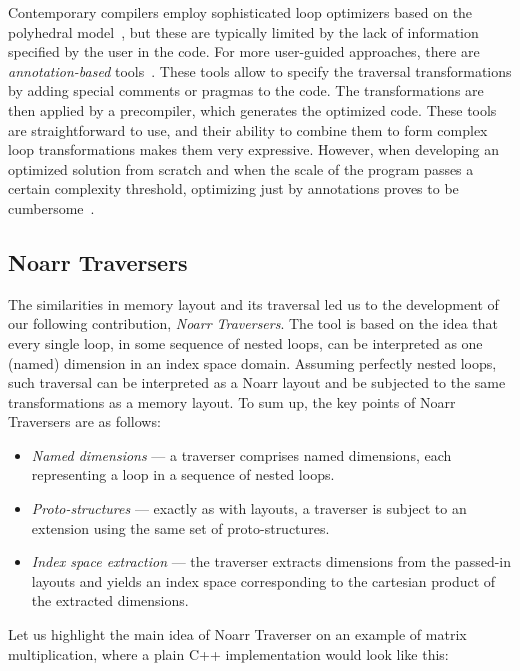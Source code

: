 Contemporary compilers employ sophisticated loop optimizers based on the polyhedral model~\cite{trifunovic2010graphite,grosser2012polly}, but these are typically limited by the lack of information specified by the user in the code. For more user-guided approaches, there are \emph{annotation-based} tools~\cite{yi2007poet,chen2008chill,namjoshi2016loopy}. These tools allow to specify the traversal transformations by adding special comments or pragmas to the code. The transformations are then applied by a precompiler, which generates the optimized code. These tools are straightforward to use, and their ability to combine them to form complex loop transformations makes them very expressive. However, when developing an optimized solution from scratch and when the scale of the program passes a certain complexity threshold, optimizing just by annotations proves to be cumbersome~\cite{kegel2009using,ajkunic2012comparison,refsnes2011comparison}.

\subsection{Noarr Traversers}

The similarities in memory layout and its traversal led us to the development of our following contribution, \emph{Noarr Traversers}. The tool is based on the idea that every single loop, in some sequence of nested loops, can be interpreted as one (named) dimension in an index space domain. Assuming perfectly nested loops, such traversal can be interpreted as a Noarr layout and be subjected to the same transformations as a memory layout. To sum up, the key points of Noarr Traversers are as follows:
\begin{itemize}
  \item \emph{Named dimensions} --- a traverser comprises named dimensions, each representing a loop in a sequence of nested loops.
  \item \emph{Proto-structures} --- exactly as with layouts, a traverser is subject to an extension using the same set of proto-structures.
  \item \emph{Index space extraction} --- the traverser extracts dimensions from the passed-in layouts and yields an index space corresponding to the cartesian product of the extracted dimensions.
\end{itemize}

Let us highlight the main idea of Noarr Traverser on an example of matrix multiplication, where a plain C++ implementation would look like this:

